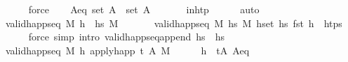 \begin{isabellebody}
\ \ \ \ \isamarkupfalse%
\ force\isanewline
\ \ \isamarkupfalse%
\ A{\isacharunderscore}{\kern0pt}eq{\isacharcolon}{\kern0pt}\ {\isachardoublequoteopen}set\ A\ {\isacharequal}{\kern0pt}\ set\ A{\isacharprime}{\kern0pt}{\isachardoublequoteclose}\isanewline
\ \ \ \ \isamarkupfalse%
\ {}{\isacharparenleft}{\kern0pt}{}{\isacharparenright}{\kern0pt}\ in{\isacharunderscore}{\kern0pt}htp\isanewline
\ \ \ \ \isamarkupfalse%
\ auto\isanewline
\ \ \isamarkupfalse%
\ \isamarkupfalse%
\ {\isachardoublequoteopen}valid{\isacharunderscore}{\kern0pt}happ{\isacharunderscore}{\kern0pt}seq\ M\ {\isacharparenleft}{\kern0pt}h\ {\isacharhash}{\kern0pt}\ hs{}{\isacharparenright}{\kern0pt}\ M{\isacharprime}{\kern0pt}{\isachardoublequoteclose}\isanewline
\ \ \ \ \isamarkupfalse%
\ {}{\isacharparenleft}{\kern0pt}{}{\isacharparenright}{\kern0pt}\ {\isacartoucheopen}valid{\isacharunderscore}{\kern0pt}happ{\isacharunderscore}{\kern0pt}seq\ M\ hs\ M{\isacharprime}{\kern0pt}{\isacartoucheclose}\ {\isacartoucheopen}{\isacharparenleft}{\kern0pt}{\isasymforall}h{\isasymin}set\ hs{}{\isachardot}{\kern0pt}\ fst\ h\ {\isasymnotin}\ htps{\isacharparenright}{\kern0pt}{\isacartoucheclose}\isanewline
\ \ \ \ \isamarkupfalse%
\ {\isacharparenleft}{\kern0pt}force\ simp{\isacharcolon}{\kern0pt}\ intro{\isacharbang}{\kern0pt}{\isacharcolon}{\kern0pt}\ valid{\isacharunderscore}{\kern0pt}happ{\isacharunderscore}{\kern0pt}seq{\isacharunderscore}{\kern0pt}append{\isacharunderscore}{\kern0pt}{}{\isacharbrackleft}{\kern0pt}\ {\isacharquery}{\kern0pt}hs{}{\isachardot}{\kern0pt}{}\ {\isacharequal}{\kern0pt}\ hs{}{\isacharbrackright}{\kern0pt}{\isacharparenright}{\kern0pt}{\isacharplus}{\kern0pt}\isanewline
\ \ \isamarkupfalse%
\ \isamarkupfalse%
\ {\isachardoublequoteopen}valid{\isacharunderscore}{\kern0pt}happ{\isacharunderscore}{\kern0pt}seq\ M\ {\isacharbrackleft}{\kern0pt}h{\isacharbrackright}{\kern0pt}\ {\isacharparenleft}{\kern0pt}apply{\isacharunderscore}{\kern0pt}happ\ {\isacharparenleft}{\kern0pt}t{\isacharcomma}{\kern0pt}\ A{\isacharprime}{\kern0pt}{\isacharparenright}{\kern0pt}\ M{\isacharparenright}{\kern0pt}{\isachardoublequoteclose}\isanewline
\ \ \ \ \isamarkupfalse%
\ {\isacartoucheopen}h\ {\isacharequal}{\kern0pt}\ {\isacharparenleft}{\kern0pt}t{\isacharcomma}{\kern0pt}A{\isacharparenright}{\kern0pt}{\isacartoucheclose}\ A{\isacharunderscore}{\kern0pt}eq\isanewline

\end{isabellebody}

